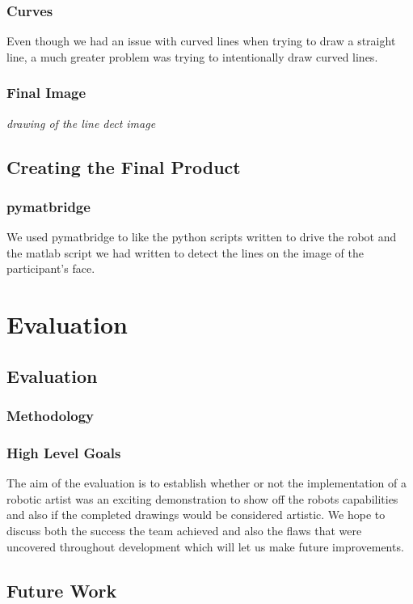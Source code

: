 \documentclass{l3proj}
\begin{document}
\subsection{Curves}
Even though we had an issue with curved lines when trying to draw a straight line, a much greater problem was trying to intentionally draw curved lines. 
\subsection{Final Image}
\textit{drawing of the line dect image}
\section{Creating the Final Product}
\subsection{pymatbridge}
\label{sec:pymatbridge}
We used \gls{pymatbridge} to like the python scripts written to drive the robot and the \gls{matlab} script we had written to detect the lines on the image of the participant's face. 


\chapter{Evaluation}

\section{Evaluation}
\subsection{Methodology}

\subsection{High Level Goals}
The aim of the evaluation is to establish whether or not the implementation of a robotic artist was an exciting demonstration to show off the robots capabilities and also if the completed drawings would be considered artistic. We hope to discuss both the success the team achieved and also the flaws that were uncovered throughout development which will let us make future improvements.

\section{Future Work}
\end{document}
